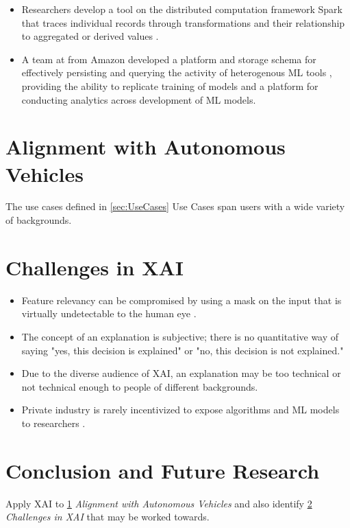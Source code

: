 \documentclass{IEEEtran}
\begin{document}
\begin{itemize}
    \item Researchers develop a tool on the distributed computation framework Spark that traces individual records through transformations and their relationship to aggregated or derived values  \cite{Interlandi2017}.
    \item A team at from Amazon developed a platform and storage schema for effectively persisting and querying the activity of heterogenous ML tools \cite{Schelter2017}, providing the ability to replicate training of models and a platform for conducting analytics across development of ML models.
\end{itemize}

\section{Alignment with Autonomous Vehicles}\label{sec:Alignment}

The use cases defined in \ref{sec:UseCases} Use Cases span users with a wide variety of backgrounds.

\section{Challenges in XAI} \label{sec:Challenges}

\begin{itemize}
    \item Feature relevancy can be compromised by using a mask on the input that is virtually undetectable to the human eye \cite{DBLP:journals/corr/abs-1812-00891}.

    \item The concept of an explanation is subjective; there is no quantitative way of saying "yes, this decision is explained" or "no, this decision is not explained." \cite{Bibal2016}

    \item Due to the diverse audience of XAI, an explanation may be too technical or not technical enough to people of different backgrounds.
    
    \item Private industry is rarely incentivized to expose algorithms and ML models to researchers \cite{Veale:2018:FAD:3173574.3174014}.
\end{itemize}

\section{Conclusion and Future Research}

Apply XAI to \ref{sec:Alignment} \textit{Alignment with Autonomous Vehicles} and also identify \ref{sec:Challenges} \textit{Challenges in XAI} that may be worked towards.


 
\end{document}
